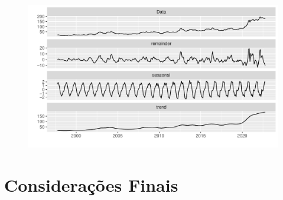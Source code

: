 \documentclass[
	12pt,				%
	openright,			%
	oneside,      %
	a4paper,			%
	english,			%
	french,				%
	spanish,			%
	brazil,				%
	]{abntex2}\usepackage[]{graphicx}\usepackage[]{xcolor}
\makeatletter
\def\maxwidth{ %
  \ifdim\Gin@nat@width>\linewidth
    \linewidth
  \else
    \Gin@nat@width
  \fi
}
\newenvironment{knitrout}{}{} %
\makeatother
\begin{document}
\begin{knitrout}
\color{fgcolor}\begin{figure}
\includegraphics[width=\maxwidth]{figure/script2-1} \end{figure}

\end{knitrout}



\chapter{Considerações Finais}



%
%



\end{document}
